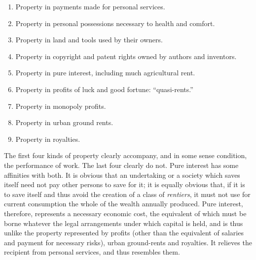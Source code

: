 \documentclass{book}
\begin{document}
\begin{enumerate}
	\item Property in payments made for personal services.


	\item Property in personal possessions necessary to health and comfort.


	\item Property in land and tools used by their owners.


	\item Property in copyright and patent rights owned by authors and inventors.


	\item Property in pure interest, including much agricultural rent.


	\item Property in profits of luck and good fortune: “quasi-rents.”


	\item Property in monopoly profits.


	\item Property in urban ground rents.


	\item Property in royalties.



\end{enumerate}
The first four kinds of property clearly accompany, and in some sense condition, the performance of work. The last four clearly do not. Pure interest has some affinities with both. It is obvious that an undertaking or a society which saves itself need not pay other persons to save for it; it is equally obvious that, if it is to save itself and thus avoid the creation of a class of \emph{rentiers}, it must not use for current consumption the whole of the wealth annually produced. Pure interest, therefore, represents a necessary economic cost, the equivalent of which must be borne whatever the legal arrangements under which capital is held, and is thus unlike the property represented by profits (other than the equivalent of salaries and payment for necessary risks), urban ground-rents and royalties. It relieves the recipient from personal services, and thus resembles them.
\end{document}
